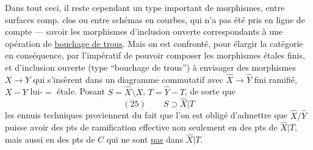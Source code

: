 Dans tout ceci, il reste cependant un
type important de  morphismes, entre
surfaces  comp. clos ou entre schémas en
courbes, qui n'a pas été pris en ligne
de compte --- savoir les morphismes
d'inclusion ouverte
correspondants à une opération de \uline{bouchage
de trous}. Mais on est confronté, pour élargir la
catégorie en conséquence, par l'impératif de
pouvoir composer les morphismes étales finis,
et d'inclusion ouverte (type ``bouchage de trous'')
à envisager des morphismes $X\longrightarrow Y$ qui
s'insèrent dans un diagramme commutatif
avec $\widehat X\longrightarrow\widehat Y$ fini ramifié, $X\mathbin{-}Y$ lui-$=$ étale.
Posant $S=\widehat X\setminus X$, $T=\widehat Y-T$, de sorte que
\[
(25)\qquad S\supset\widehat X|T
\]
les ennuis techniques proviennent du fait que
l'on est obligé d'admettre que $\widehat X/\widehat Y$ puisse avoir des
pts de ramification effective non seulement en
des pts de $\widehat X|T$, mais aussi en des pts de $C$ qui
ne sont \uline{pas} dans $\widehat X|T$.
